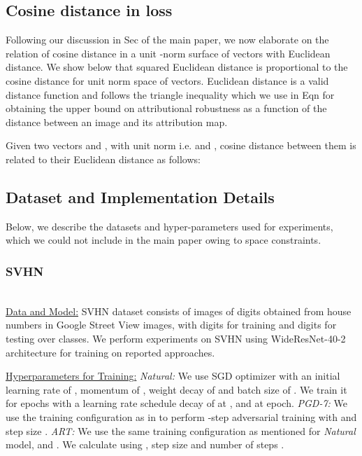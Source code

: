 \documentclass[runningheads]{llncs}
\begin{document}
\subsection{Cosine distance in  loss}\label{cosine}
Following our discussion in Sec  of the main paper, we now elaborate on the relation of cosine distance in a unit -norm surface of vectors with Euclidean distance. We show below that squared Euclidean distance is proportional to the cosine distance for unit  norm space of vectors. Euclidean distance is a valid distance function and follows the triangle inequality which we use in Eqn  for obtaining the upper bound on attributional robustness as a function of the distance between an image and its attribution map.

\noindent Given two vectors  and , with unit  norm i.e.  and , cosine distance between them is related to their Euclidean distance as follows:


\subsection{Dataset and Implementation Details}\label{dataset_attr}
Below, we describe the datasets and hyper-parameters used for experiments, which we could not include in the main paper owing to space constraints.

\subsubsection{SVHN}\hspace*{\fill} \\
\noindent \underline{Data and Model:} SVHN dataset \cite{svhn} consists of images of digits obtained from house numbers in Google Street View images, with  digits for training and  digits for testing over  classes. We perform experiments on SVHN using WideResNet-40-2 \cite{wrn} architecture for training on reported approaches. \vspace{3pt}

\noindent \underline{Hyperparameters for Training:} \newline
\textit{Natural:} We use SGD optimizer with an initial learning rate of , momentum of ,   weight decay of  and batch size of . We train it for  epochs with a learning rate schedule decay of  at ,  and  at  epoch.
\newline
\textit{PGD-7:} We use the training configuration as in \cite{model_cifar} to perform -step adversarial training with  and step size .      
\newline 
\textit{ART:} We use the same training configuration as mentioned for \textit{Natural} model,  and . We calculate  using , step size  and number of steps .
\end{document}
